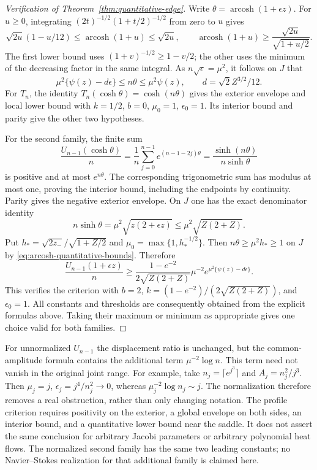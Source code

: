 \begin{proof}[Verification of Theorem~\ref{thm:quantitative-edge}]
Write $\theta=\operatorname{arcosh}(1+\epsilon z)$.  For $u\ge0$,
integrating $(2t)^{-1/2}(1+t/2)^{-1/2}$ from zero to $u$ gives
\begin{equation}\label{eq:arcosh-quantitative-bounds}
 \sqrt{2u}(1-u/12)\le\operatorname{arcosh}(1+u)
 \le\sqrt{2u},\qquad
 \operatorname{arcosh}(1+u)\ge
                \frac{\sqrt{2u}}{\sqrt{1+u/2}}.
\end{equation}
The first lower bound uses $(1+v)^{-1/2}\ge1-v/2$; the other uses
the minimum of the decreasing factor in the same integral.
As $n\sqrt\epsilon=\mu^2$, it follows on $J$ that
\[
 \mu^2\{\psi(z)-d\epsilon\}\le n\theta
       \le\mu^2\psi(z),\qquad d=\sqrt2 Z^{3/2}/12.
\]
For $T_n$, the identity $T_n(\cosh\theta)=\cosh(n\theta)$ gives
the exterior envelope and local lower bound with
$k=1/2$, $b=0$, $\mu_0=1$, $\epsilon_0=1$.
Its interior bound and parity give the other two hypotheses.

For the second family, the finite sum
\[
 \frac{U_{n-1}(\cosh\theta)}n
  =\frac1n\sum_{j=0}^{n-1}e^{(n-1-2j)\theta}
  =\frac{\sinh(n\theta)}{n\sinh\theta}
\]
is positive and at most $e^{n\theta}$.  The corresponding trigonometric
sum has modulus at most one, proving the interior bound, including the
endpoints by continuity.  Parity gives the negative exterior envelope.
On $J$ one has the exact denominator identity
\[
 n\sinh\theta=\mu^2\sqrt{z(2+\epsilon z)}
       \le\mu^2\sqrt{Z(2+Z)}.
\]
Put $h_*=\sqrt{2z_-}/\sqrt{1+Z/2}$ and
$\mu_0=\max\{1,h_*^{-1/2}\}$.  Then
$n\theta\ge\mu^2h_*\ge1$ on $J$ by
\eqref{eq:arcosh-quantitative-bounds}.  Therefore
\[
 \frac{U_{n-1}(1+\epsilon z)}n
 \ge\frac{1-e^{-2}}{2\sqrt{Z(2+Z)}}\mu^{-2}
                    e^{\mu^2\{\psi(z)-d\epsilon\}}.
\]
This verifies the criterion with $b=2$,
$k=(1-e^{-2})/(2\sqrt{Z(2+Z)})$, and $\epsilon_0=1$.
All constants and thresholds are consequently obtained from the explicit
formulas above.  Taking their maximum or minimum as appropriate gives
one choice valid for both families.
\end{proof}

\begin{remark}
For unnormalized $U_{n-1}$ the displacement ratio is unchanged, but
the common-amplitude formula contains the additional term
$\mu^{-2}\log n$.  This term need not vanish in the original joint
range.  For example, take $n_j=\lceil e^{j^3}\rceil$ and
$A_j=n_j^2/j^3$.  Then $\mu_j=j$, $\epsilon_j=j^4/n_j^2\to0$,
whereas $\mu_j^{-2}\log n_j\sim j$.
The normalization therefore removes a real obstruction, rather than
only changing notation.  The profile criterion requires positivity on
the exterior, a global envelope on both sides, an interior bound, and
a quantitative lower bound near the saddle.  It does not assert the
same conclusion for arbitrary Jacobi parameters or arbitrary
polynomial heat flows.  The normalized second family has the same two
leading constants; no Navier--Stokes realization for that additional
family is claimed here.
\end{remark}
